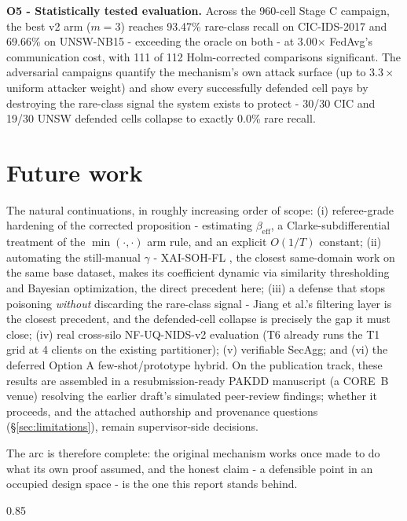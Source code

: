 \documentclass[11pt,a4paper]{report}
\begin{document}
\textbf{O5 - Statistically tested evaluation.} Across the 960-cell Stage C
campaign, the best v2 arm ($m = 3$) reaches 93.47\% rare-class recall on
CIC-IDS-2017 and 69.66\% on UNSW-NB15 - exceeding the oracle on both - at
3.00$\times$ FedAvg's communication cost, with 111 of 112 Holm-corrected
comparisons significant. The adversarial campaigns quantify the mechanism's
own attack surface (up to $3.3\times$ uniform attacker weight) and show
every successfully defended cell pays by destroying the rare-class signal
the system exists to protect - 30/30 CIC and 19/30 UNSW defended cells
collapse to exactly 0.0\% rare recall.

\section{Future work}
\label{sec:future}

The natural continuations, in roughly increasing order of scope: (i)
referee-grade hardening of the corrected proposition - estimating
$\beta_{\mathrm{eff}}$, a Clarke-subdifferential treatment of the
$\min(\cdot,\cdot)$ arm rule, and an explicit $O(1/T)$ constant; (ii)
automating the still-manual $\gamma$ - XAI-SOH-FL \cite{xaisohfl}, the
closest same-domain work on the same base dataset, makes its coefficient
dynamic via similarity thresholding and Bayesian optimization, the
direct precedent here; (iii) a defense that stops poisoning
\emph{without} discarding the rare-class signal - Jiang et al.'s
filtering layer \cite{jiang2024} is the closest precedent, and the
defended-cell collapse is precisely the gap it must close; (iv) real
cross-silo NF-UQ-NIDS-v2 evaluation (T6 already runs the T1 grid at 4
clients on the existing partitioner); (v) verifiable SecAgg; and (vi)
the deferred Option A few-shot/prototype hybrid. On the publication
track, these results are assembled in a resubmission-ready PAKDD
manuscript \cite{fedgraa2026submission} (a CORE~B venue) resolving the
earlier draft's simulated peer-review findings; whether it proceeds, and
the attached authorship and provenance questions
(\S\ref{sec:limitations}), remain supervisor-side decisions.

The arc is therefore complete: the original mechanism works once made to
do what its own proof assumed, and the honest claim - a defensible point
in an occupied design space - is the one this report stands behind.

\clearpage
{}

{\scriptsize
\setlength{\itemsep}{0pt}
\setlength{\parsep}{0pt}
\begin{spacing}{0.85}

\end{spacing}
}
\end{document}
